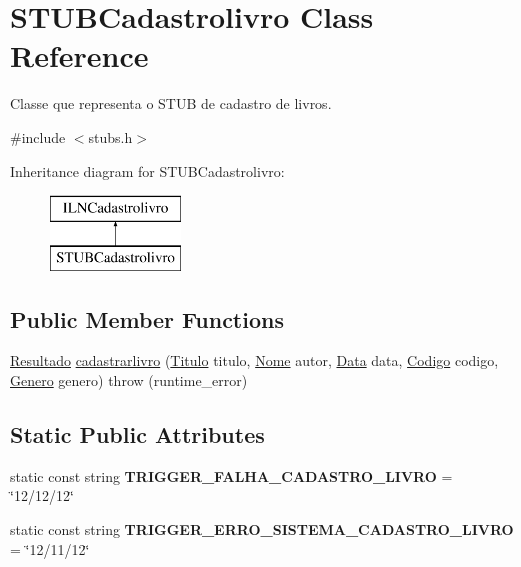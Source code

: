 \hypertarget{classSTUBCadastrolivro}{}\section{S\+T\+U\+B\+Cadastrolivro Class Reference}
\label{classSTUBCadastrolivro}


Classe que representa o S\+T\+UB de cadastro de livros.  




{\ttfamily \#include $<$stubs.\+h$>$}

Inheritance diagram for S\+T\+U\+B\+Cadastrolivro\+:\begin{figure}[H]
\begin{center}
\leavevmode
\includegraphics[height=2.000000cm]{classSTUBCadastrolivro}
\end{center}
\end{figure}
\subsection*{Public Member Functions}
\begin{DoxyCompactItemize}
\item 
\hyperlink{classResultado}{Resultado} \hyperlink{classSTUBCadastrolivro_aadf0031014810edcaac8c456bafceb48}{cadastrarlivro} (\hyperlink{classTitulo}{Titulo} titulo, \hyperlink{classNome}{Nome} autor, \hyperlink{classData}{Data} data, \hyperlink{classCodigo}{Codigo} codigo, \hyperlink{classGenero}{Genero} genero)  throw (runtime\+\_\+error)
\end{DoxyCompactItemize}
\subsection*{Static Public Attributes}
\begin{DoxyCompactItemize}
\item 
\mbox{\label{classSTUBCadastrolivro_a2623ead55b1b8332c8c69291d5e1b49d}} 
static const string {\bfseries T\+R\+I\+G\+G\+E\+R\+\_\+\+F\+A\+L\+H\+A\+\_\+\+C\+A\+D\+A\+S\+T\+R\+O\+\_\+\+L\+I\+V\+RO} = \char`\"{}12/12/12\char`\"{}
\item 
\mbox{\label{classSTUBCadastrolivro_aa4536f549272d3878dc791211779353e}} 
static const string {\bfseries T\+R\+I\+G\+G\+E\+R\+\_\+\+E\+R\+R\+O\+\_\+\+S\+I\+S\+T\+E\+M\+A\+\_\+\+C\+A\+D\+A\+S\+T\+R\+O\+\_\+\+L\+I\+V\+RO} = \char`\"{}12/11/12\char`\"{}
\end{DoxyCompactItemize}


